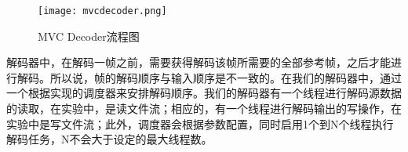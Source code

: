 \begin{figure}[htbp]
\begin{center}
\texttt{[image: mvcdecoder.png]}
\caption{MVC Decoder流程图}
\label{fig:mvcdecoder}
\end{center}
\end{figure}
解码器中，在解码一帧之前，需要获得解码该帧所需要的全部参考帧，之后才能进行解码。所以说，帧的解码顺序与输入顺序是不一致的。在我们的解码器中，通过一个根据实现的调度器来安排解码顺序。我们的解码器有一个线程进行解码源数据的读取，在实验中，是读文件流；相应的，有一个线程进行解码输出的写操作，在实验中是写文件流；此外，调度器会根据参数配置，同时启用1个到N个线程执行解码任务，N不会大于设定的最大线程数。
